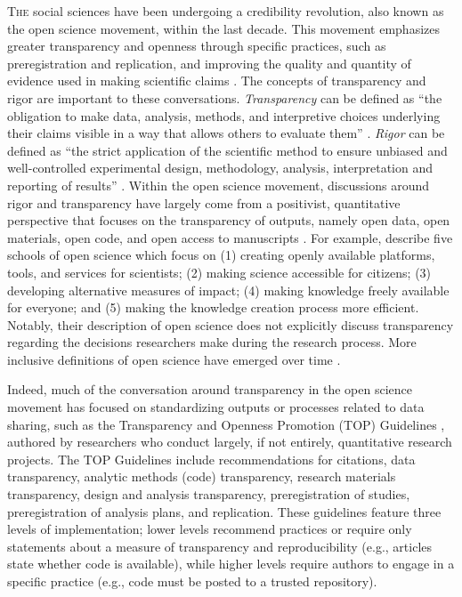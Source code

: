 \documentclass[authordate, meta, issue]{jote-new-article}
\begin{document}
\lettrine{T}{he} social sciences have been undergoing a credibility revolution, also known as the open science movement, within the last decade. This movement emphasizes greater transparency and openness through specific practices, such as preregistration and replication, and improving the quality and quantity of evidence used in making scientific claims \parencites{Vazire2018}. The concepts of transparency and rigor are important to these conversations. \emph{Transparency} can be defined as “the obligation to make data, analysis, methods, and interpretive choices underlying their claims visible in a way that allows others to evaluate them” \parencites{Moravcsik2019}. \emph{Rigor }can be defined as “the strict application of the scientific method to ensure unbiased and well-controlled experimental design, methodology, analysis, interpretation and reporting of results” \parencites{NIHND}. Within the open science movement, discussions around rigor and transparency have largely come from a positivist, quantitative perspective that focuses on the transparency of outputs, namely open data, open materials, open code, and open access to manuscripts \parencites{Hagger2019}{Lyon2016}{Powers2019}. For example, \textcite{Fecher2014} describe five schools of open science which focus on (1) creating openly available platforms, tools, and services for scientists; (2) making science accessible for citizens; (3) developing alternative measures of impact; (4) making knowledge freely available for everyone; and (5) making the knowledge creation process more efficient. Notably, their description of open science does not explicitly discuss transparency regarding the decisions researchers make during the research process. More inclusive definitions of open science have emerged over time \parencites[e.g., United Nations Educational, Scientific and Cultural][]{Organization2021}.



Indeed, much of the conversation around transparency in the open science movement has focused on standardizing outputs or processes related to data sharing, such as the Transparency and Openness Promotion (TOP) Guidelines \parencites{Nosek2015}, authored by researchers who conduct largely, if not entirely, quantitative research projects. The TOP Guidelines include recommendations for citations, data transparency, analytic methods (code) transparency, research materials transparency, design and analysis transparency, preregistration of studies, preregistration of analysis plans, and replication. These guidelines feature three levels of implementation; lower levels recommend practices or require only statements about a measure of transparency and reproducibility (e.g., articles state whether code is available), while higher levels require authors to engage in a specific practice (e.g., code must be posted to a trusted repository).
\end{document}

